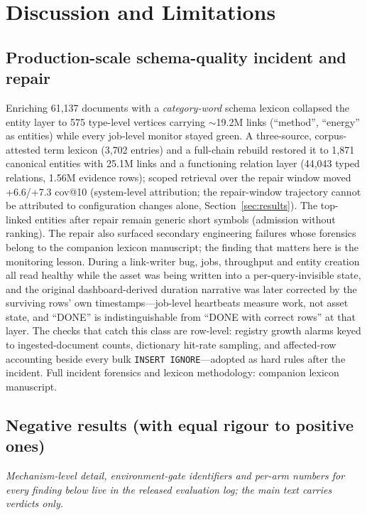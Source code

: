 \documentclass[sigconf,nonacm]{acmart}
\begin{document}
\section{Discussion and Limitations}
\label{sec:discussion}

\subsection{Production-scale schema-quality incident and repair}
\label{sec:incident}

Enriching 61{,}137 documents with a \emph{category-word} schema lexicon
collapsed the entity layer to 575 type-level vertices carrying ${\sim}$19.2M
links (``method'', ``energy'' as entities) while every job-level monitor
stayed green. A three-source, corpus-attested term lexicon (3{,}702 entries)
and a full-chain rebuild restored it to 1{,}871 canonical entities with
25.1M links and a functioning relation layer (44{,}043 typed relations, 1.56M
evidence rows); scoped retrieval over the repair window moved +6.6/+7.3
cov@10 (system-level attribution; the repair-window trajectory cannot
be attributed to configuration changes alone, Section~\ref{sec:results}). The top-linked entities after
repair remain generic short symbols (admission without ranking). The
repair also surfaced secondary engineering failures whose forensics
belong to the companion lexicon manuscript; the finding that matters
here is the monitoring lesson. During a link-writer bug, jobs,
throughput and entity creation all read healthy while the asset was
being written into a per-query-invisible state, and the original
dashboard-derived duration narrative was later corrected by the
surviving rows' own timestamps---job-level heartbeats measure work, not
asset state, and ``DONE'' is indistinguishable from ``DONE with correct
rows'' at that layer. The checks that catch this class are row-level:
registry growth alarms keyed to ingested-document counts, dictionary
hit-rate sampling, and affected-row accounting beside every bulk
\texttt{INSERT IGNORE}---adopted as hard rules after the incident.
Full incident forensics and lexicon methodology: companion lexicon
manuscript.

\subsection{Negative results (with equal rigour to positive ones)}

\textit{Mechanism-level detail, environment-gate identifiers and per-arm
numbers for every finding below live in the released evaluation log; the
main text carries verdicts only.}
\label{sec:negative}
\end{document}
